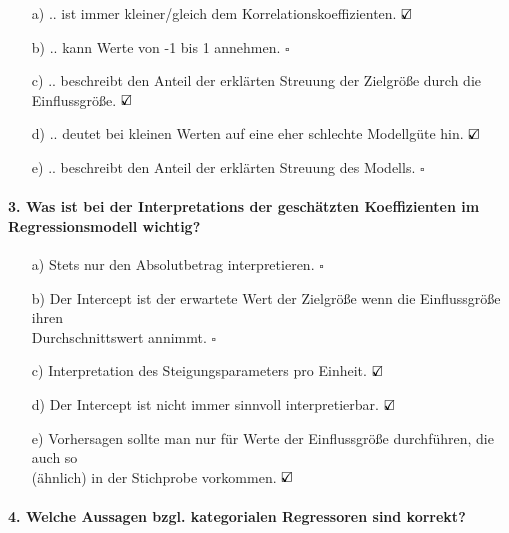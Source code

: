 \documentclass[a4paper]{article}
\begin{document}
\begin{itemize}
    \item[a)] .. ist immer kleiner/gleich dem Korrelationskoeffizienten. \hfill $\text{\rlap{$\checkmark$}}\square$
    \item[b)] .. kann Werte von -1 bis 1 annehmen. \hfill $\square$
    \item[c)] .. beschreibt den Anteil der erklärten Streuung der Zielgröße durch die Einflussgröße. \hfill $\text{\rlap{$\checkmark$}}\square$
    \item[d)] .. deutet bei kleinen Werten auf eine eher schlechte Modellgüte hin. \hfill $\text{\rlap{$\checkmark$}}\square$
    \item[e)] .. beschreibt den Anteil der erklärten Streuung des Modells. \hfill $\square$
\end{itemize}

\paragraph{3. Was ist bei der Interpretations der geschätzten Koeffizienten im Regressionsmodell wichtig?}

\begin{itemize}
    \item[a)] Stets nur den Absolutbetrag interpretieren. \hfill $\square$
    \item[b)] Der Intercept ist der erwartete Wert der Zielgröße wenn die Einflussgröße ihren\\Durchschnittswert annimmt. \hfill $\square$
    \item[c)] Interpretation des Steigungsparameters pro Einheit. \hfill $\text{\rlap{$\checkmark$}}\square$
    \item[d)] Der Intercept ist nicht immer sinnvoll interpretierbar. \hfill $\text{\rlap{$\checkmark$}}\square$
    \item[e)] Vorhersagen sollte man nur für Werte der Einflussgröße durchführen, die auch so\\(ähnlich) in der Stichprobe vorkommen. \hfill $\text{\rlap{$\checkmark$}}\square$
\end{itemize}

\paragraph{4. Welche Aussagen bzgl. kategorialen Regressoren sind korrekt?}
\end{document}
